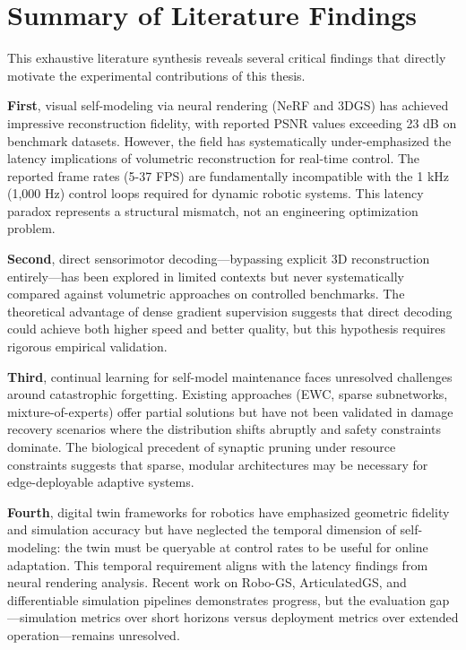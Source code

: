 \documentclass[12pt,a4paper,oneside]{report}
\begin{document}
\section{Summary of Literature Findings}

This exhaustive literature synthesis reveals several critical findings that directly motivate the experimental contributions of this thesis.

\textbf{First}, visual self-modeling via neural rendering (NeRF and 3DGS) has achieved impressive reconstruction fidelity, with reported PSNR values exceeding 23 dB on benchmark datasets. However, the field has systematically under-emphasized the latency implications of volumetric reconstruction for real-time control. The reported frame rates (5-37 FPS) are fundamentally incompatible with the 1 kHz (1,000 Hz) control loops required for dynamic robotic systems. This latency paradox represents a structural mismatch, not an engineering optimization problem.

\textbf{Second}, direct sensorimotor decoding—bypassing explicit 3D reconstruction entirely—has been explored in limited contexts but never systematically compared against volumetric approaches on controlled benchmarks. The theoretical advantage of dense gradient supervision suggests that direct decoding could achieve both higher speed and better quality, but this hypothesis requires rigorous empirical validation.

\textbf{Third}, continual learning for self-model maintenance faces unresolved challenges around catastrophic forgetting. Existing approaches (EWC, sparse subnetworks, mixture-of-experts) offer partial solutions but have not been validated in damage recovery scenarios where the distribution shifts abruptly and safety constraints dominate. The biological precedent of synaptic pruning under resource constraints suggests that sparse, modular architectures may be necessary for edge-deployable adaptive systems.

\textbf{Fourth}, digital twin frameworks for robotics have emphasized geometric fidelity and simulation accuracy but have neglected the temporal dimension of self-modeling: the twin must be queryable at control rates to be useful for online adaptation. This temporal requirement aligns with the latency findings from neural rendering analysis. Recent work on Robo-GS, ArticulatedGS, and differentiable simulation pipelines demonstrates progress, but the evaluation gap—simulation metrics over short horizons versus deployment metrics over extended operation—remains unresolved.
\end{document}
